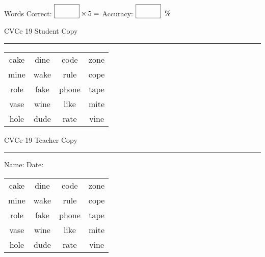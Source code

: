 \documentclass{memoir}
\begin{document}
\small

Words Correct: $\fbox{\phantom{\huge 100}} \times 5 = $ Accuracy: $\fbox{\phantom{\huge 100}}\;\; \%$ 

\vfill

\newpage


\footnotesize \noindent
CVCe 19 \hfill Student Copy
\smallskip
\hrule

\Large

\setlength{\tabcolsep}{14pt}
\def\arraystretch{2}

{\selectfont


\begin{vplace}[0.5]
\begin{center}
\begin{tabular}{cccc}
cake & dine & code & zone \\
mine & wake & rule & cope \\
role & fake & phone & tape \\
vase & wine & like & mite \\
hole & dude & rate & vine \\
\end{tabular}
\end{center}
\end{vplace}

}

\newpage

\footnotesize \noindent
CVCe 19 \hfill Teacher Copy
\smallskip
\hrule

\small

\vfill

\noindent
Name: \underline{\hspace{1.75in}} \hfill Date: \underline{\hspace{1in}}

\Large

{\selectfont


\begin{vplace}[0.5]
\begin{center}
\begin{tabular}{cccc}
cake & dine & code & zone \\
mine & wake & rule & cope \\
role & fake & phone & tape \\
vase & wine & like & mite \\
hole & dude & rate & vine \\
\end{tabular}
\end{center}
\end{vplace}



}
\end{document}
